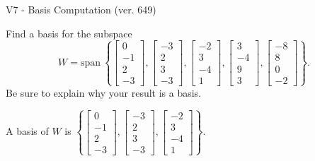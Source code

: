 \begin{exercise}
  \begin{exerciseTitle}V7 - Basis Computation (ver. 649)\end{exerciseTitle}
  \begin{exerciseStatement}
    Find a basis for the subspace 
\[W=\mathrm{span}\ \left\{\left[\begin{array}{r}
0 \\
-1 \\
2 \\
-3
\end{array}\right] , \left[\begin{array}{r}
-3 \\
2 \\
3 \\
-3
\end{array}\right] , \left[\begin{array}{r}
-2 \\
3 \\
-4 \\
1
\end{array}\right] , \left[\begin{array}{r}
3 \\
-4 \\
9 \\
3
\end{array}\right] , \left[\begin{array}{r}
-8 \\
8 \\
0 \\
-2
\end{array}\right]\right\}.\]
 Be sure to explain why your result is a basis.


  \end{exerciseStatement}
  \begin{exerciseAnswer}
   A basis of \(W\) is  \(\left\{\left[\begin{array}{r}
0 \\
-1 \\
2 \\
-3
\end{array}\right] , \left[\begin{array}{r}
-3 \\
2 \\
3 \\
-3
\end{array}\right] , \left[\begin{array}{r}
-2 \\
3 \\
-4 \\
1
\end{array}\right]\right\}\).
  


  \end{exerciseAnswer}
\end{exercise}